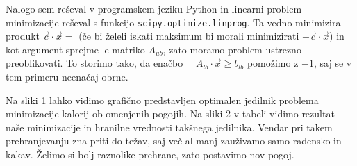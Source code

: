 \documentclass[slovene,11pt,a4paper]{article}
\begin{document}
Nalogo sem reševal v programskem jeziku Python in linearni problem minimizacije reševal s funkcijo \texttt{scipy.optimize.linprog}. Ta vedno minimizira produkt $\vec{c}\cdot \vec{x} =$ (če bi želeli iskati maksimum bi morali minimizirati $-\vec{c}\cdot \vec{x}$) in kot argument sprejme le matriko $A_{ub}$, zato moramo problem ustrezno preoblikovati. To storimo tako, da enačbo $\quad A_{lb} \cdot \vec{x} \geq b_{lb}$ pomožimo z $-1$, saj se v tem primeru neenačaj obrne.

Na sliki 1 lahko vidimo grafično predstavljen optimalen jedilnik problema minimizacije kalorij ob omenjenih pogojih. Na sliki 2 v tabeli vidimo rezultat naše minimizacije in hranilne vrednosti takšnega jedilnika. Vendar pri takem prehranjevanju zna priti do težav, saj več al manj zauživamo samo radensko in kakav. Želimo si bolj raznolike prehrane, zato postavimo nov pogoj.
\end{document}
